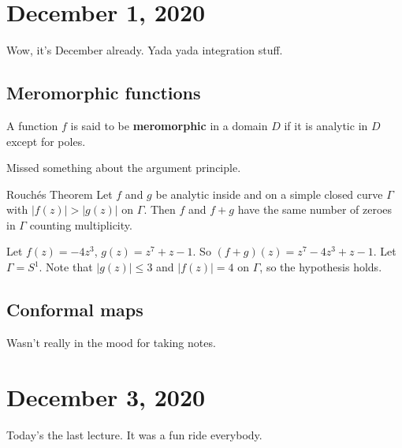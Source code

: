 \section{December 1, 2020}
Wow, it's December already. Yada yada integration stuff.
\subsection{Meromorphic functions}
\begin{definition}
A function $f$ is said to be \textbf{meromorphic} in a domain $D$ if it is analytic in $D$ except for poles.
\end{definition}
Missed something about the argument principle.
\begin{namedthm}{Rouch\'es Theorem}
    Let $f$ and $g$ be analytic inside and on a simple closed curve $\Gamma $ with $|f(z)|>|g(z)|$ on $\Gamma $. Then $f$ and $f+g$ have the same number of zeroes in $\Gamma $ counting multiplicity.
\end{namedthm}
\begin{example}
    Let $f(z)=-4z^3$, $g(z)=z^7+z-1$. So $(f+g)(z)=z^7-4z^3+z-1$. Let $\Gamma=S^1  $. Note that $|g(z)|\leq 3$ and $|f(z)|=4$ on $\Gamma $, so the hypothesis holds.
\end{example}
\subsection{Conformal maps}
Wasn't really in the mood for taking notes.
\section{December 3, 2020}
Today's the last lecture. It was a fun ride everybody.
\orbreak
